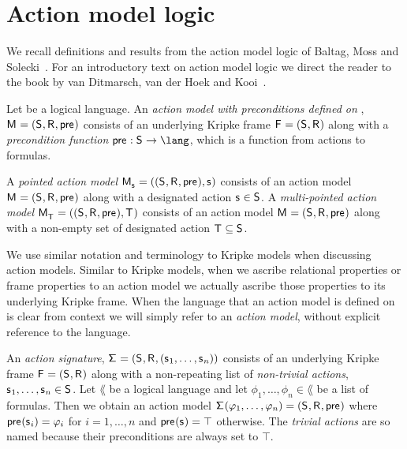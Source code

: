 \section{Action model logic}\label{aml}

We recall definitions and results from the action model logic of Baltag, Moss and Solecki~\cite{baltag:1998,baltag:2004}.
For an introductory text on action model logic we direct the reader to the book by van Ditmarsch, van der Hoek and Kooi~\cite{vanditmarsch:2007}.

\begin{definition}
Let \lang{} be a logical language.
An {\em action model with preconditions defined on \lang{}}, $\aModelAndTuple$ consists of an underlying Kripke frame $\aFrameAndTuple$ along with a {\em precondition function} $\aPrecondition : \aStates \to \lang$, which is a function from actions to formulas.

A {\em pointed action model} $\aPModelAndTuple{\aStateS}$ consists of an action model $\aModelAndTuple$ along with a designated action $\aStateS \in \aStates$.
A {\em multi-pointed action model} $\aPModelAndTuple{\aStatesT}$ consists of an action model $\aModelAndTuple$ along with a non-empty set of designated action $\aStatesT \subseteq \aStates$.
\end{definition}

We use similar notation and terminology to Kripke models when discussing action models.
Similar to Kripke models, when we ascribe relational properties or frame properties to an action model we actually ascribe those properties to its underlying Kripke frame.
When the language that an action model is defined on is clear from context we will simply refer to an {\em action model}, without explicit reference to the language.

\begin{definition}
An {\em action signature}, $\aSignatureAndTuple$ consists of an underlying Kripke frame $\aFrameAndTuple$ along with a non-repeating list of {\em non-trivial actions}, $\aStateS_1, \dots, \aStateS_n \in \aStates$.
Let $\lang$ be a logical language and let $\phi_1, \dots, \phi_n \in \lang$ be a list of formulas.
Then we obtain an action model $\aSignature(\phi_1, \dots, \phi_n) = \aModelTuple$ where $\aPrecondition(\aStateS_i) = \phi_i$ for $i = 1, \dots, n$ and $\aPrecondition(\aStateS) = \top$ otherwise.
The {\em trivial actions} are so named because their preconditions are always set to $\top$.
\end{definition}

